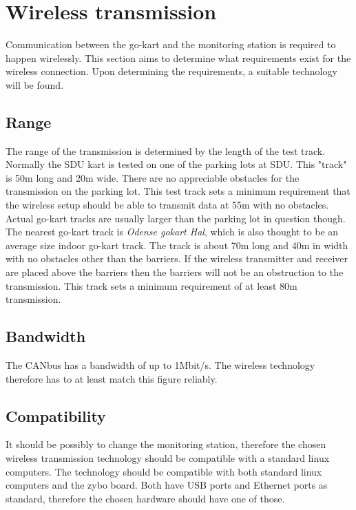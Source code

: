 
\section{Wireless transmission}
Communication between the go-kart and the monitoring station is required to happen wirelessly.
This section aims to determine what requirements exist for the wireless connection. 
Upon determining the requirements, a suitable technology will be found.

\subsection{Range}
The range of the transmission is determined by the length of the test track. 
Normally the SDU kart is tested on one of the parking lots at SDU.
This "track" is 50\si{\metre} long and 20\si{\metre} wide.
There are no appreciable obstacles for the transmission on the parking lot. 
This test track sets a minimum requirement that the wireless setup should be able to transmit data at 55m with no obstacles.
\\
Actual go-kart tracks are usually larger than the parking lot in question though. 
The nearest go-kart track is \textit{Odense gokart Hal}, which is also thought to be an average size indoor go-kart track.
The track is about 70m long and 40m in width with no obstacles other than the barriers. 
If the wireless transmitter and receiver are placed above the barriers then the barriers will not be an obstruction to the transmission. 
This track sets a minimum requirement of at least 80m transmission.

\subsection{Bandwidth}
The CANbus has a bandwidth of up to 1Mbit/s.
The wireless technology therefore has to at least match this figure reliably.

\subsection{Compatibility}
It should be possibly to change the monitoring station, therefore the chosen wireless transmission technology should be compatible with a standard linux computers.
The technology should be compatible with both standard linux computers and the zybo board.
Both have USB ports and Ethernet ports as standard, therefore the chosen hardware should have one of those.

